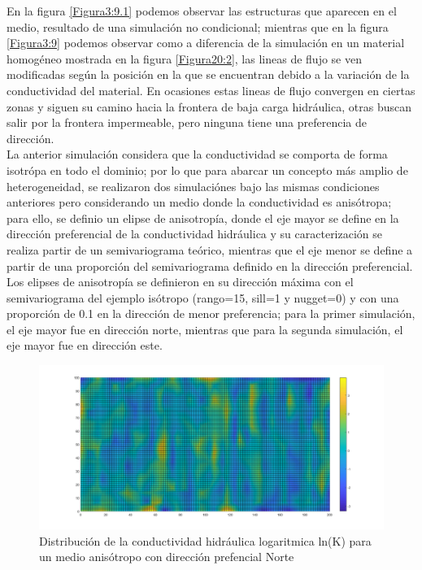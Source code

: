 \newpage


En la figura \ref{Figura3:9.1} podemos observar las estructuras que aparecen en el medio, resultado de una simulación no condicional; mientras que en la figura \ref{Figura3:9} podemos observar como a diferencia de la simulación en un material homogéneo mostrada en la figura \ref{Figura20:2}, las lineas de flujo se ven modificadas según la posición en la que se encuentran debido a la variación de la conductividad del material. En ocasiones estas lineas de flujo convergen en ciertas zonas y siguen su camino hacia la frontera de baja carga hidráulica, otras buscan salir por la frontera impermeable, pero ninguna tiene una preferencia de dirección.
\\

La anterior simulación considera que la conductividad se comporta de forma isotrópa en todo el dominio; por lo que para abarcar un concepto más amplio de heterogeneidad, se realizaron dos simulaciónes bajo las mismas condiciones anteriores pero considerando un medio donde la conductividad es anisótropa; para ello, se definio un elipse de anisotropía, donde el eje mayor se define en la dirección preferencial de la conductividad hidráulica y su caracterización se realiza partir de un semivariograma teórico, mientras que el eje menor se define a partir de una proporción del semivariograma definido en la dirección preferencial. 
\\

Los elipses de anisotropía se definieron en su dirección máxima con el semivariograma del ejemplo isótropo (rango=15, sill=1 y nugget=0) y con una proporción de 0.1 en la dirección de menor preferencia; para la primer simulación, el eje mayor fue en dirección norte, mientras que para la segunda simulación, el eje mayor fue en dirección este.

\begin{figure}[H]
\centering
\includegraphics[scale=0.45]{Figura38}
\caption{ Distribución de la conductividad hidráulica logaritmica ln(K) para un medio anisótropo con dirección prefencial Norte }
\label{Figura3:10}
\end{figure}


